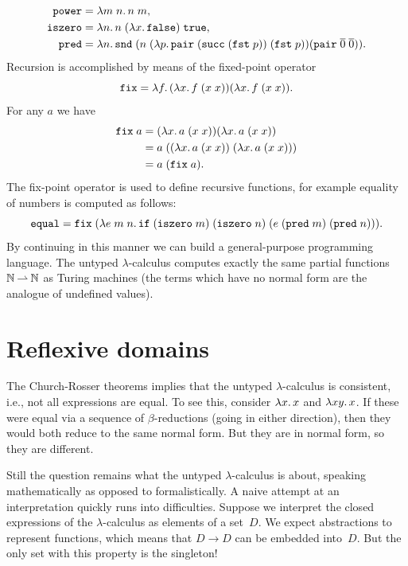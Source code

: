 %
\begin{align*}
  \mathtt{power} &= \lambda m\;n .\,n\;m,\\
  \mathtt{iszero} &= \lambda n .\,n\; (\lambda x .\,\mathtt{false})\; \mathtt{true},\\
  \mathtt{pred} &=
    \lambda n .\,
      \mathtt{snd}\; (n\; (\lambda p .\,
        \mathtt{pair}\; (\mathtt{succ}\; (\mathtt{fst}\; p))\;
        (\mathtt{fst}\; p))
      (\mathtt{pair}\; \overline{0}\; \overline{0})).
\end{align*}
%
Recursion is accomplished by means of the fixed-point operator
%
\begin{equation*}
  \mathtt{fix} = \lambda f .\,(\lambda x .\,f\;(x\;x)) (\lambda x .\,f\;(x\;x)).
\end{equation*}
%
For any $a$ we have
%
\begin{align*}
  \mathtt{fix}\;a &=
  (\lambda x .\,a\;(x\;x)) (\lambda x .\,a\;(x\;x)) \\
  &= a\;((\lambda x .\,a\;(x\;x))\;(\lambda x .\,a\;(x\;x))) \\
  &= a\;(\mathtt{fix}\;a).
\end{align*}
%
The fix-point operator is used to define recursive functions, for
example equality of numbers is computed as follows:
%
\begin{equation*}
  \mathtt{equal} = \mathtt{fix}\;(\lambda e\;m\;n .\,
    \mathtt{if}\;
    (\mathtt{iszero}\;m)\;
    (\mathtt{iszero}\;n)\;
    (e\;(\mathtt{pred}\;m)\;(\mathtt{pred}\;n))).
\end{equation*}
%
By continuing in this manner we can build a general-purpose
programming language. The untyped $\lambda$-calculus computes exactly
the same partial functions $\mathbb{N} \mathbin{\rightharpoonup} \mathbb{N}$ as Turing machines (the
terms which have no normal form are the analogue of undefined values).


\section{Reflexive domains}
\label{sec:reflexive-domains}

The Church-Rosser theorems implies that the untyped $\lambda$-calculus
is consistent, i.e., not all expressions are equal. To see this,
consider $\lambda x .\,x$ and $\lambda x y .\,x$. If these were equal via
a sequence of $\beta$-reductions (going in either direction), then
they would both reduce to the same normal form. But they are in normal
form, so they are different.

Still the question remains what the untyped $\lambda$-calculus is
about, speaking mathematically as opposed to formalistically. A naive
attempt at an interpretation quickly runs into difficulties. Suppose
we interpret the closed expressions of the $\lambda$-calculus as
elements of a set~$D$. We expect abstractions to represent functions,
which means that $D \to D$ can be embedded into~$D$. But the only set
with this property is the singleton!

